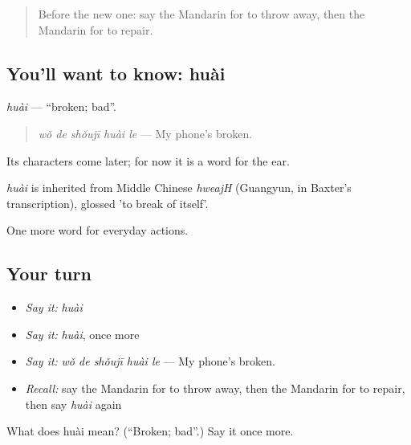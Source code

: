 \label{lesson:ZH-C103-huai}



\begin{quote}
Before the new one: say the Mandarin for to throw away, then the Mandarin for to repair.
\end{quote}

\subsection*{You'll want to know: huài}
\emph{huài} — \textquotedblleft{}broken; bad\textquotedblright{}.

\begin{quote}
\emph{wǒ de shǒujī huài le} — My phone's broken.
\end{quote}

Its characters come later; for now it is a word for the ear.

\begin{cousinweb}
\emph{huài} is inherited from Middle Chinese \emph{hweajH} (Guangyun, in Baxter's transcription), glossed 'to break of itself'.
\end{cousinweb}

\begin{grammarlens}[title={What you've built}]
One more word for everyday actions.
\end{grammarlens}

\subsection*{Your turn}
\begin{itemize}
\raggedright
  \item \emph{Say it:} \emph{huài}
  \item \emph{Say it:} \emph{huài}, once more
  \item \emph{Say it:} \emph{wǒ de shǒujī huài le} — My phone's broken.
  \item \emph{Recall:} say the Mandarin for to throw away, then the Mandarin for to repair, then say \emph{huài} again
\end{itemize}

\begin{tcolorbox}[breakable,colback=teal!4,colframe=teal!35!black,title={Before you move on}]
What does huài mean? (\textquotedblleft{}Broken; bad\textquotedblright{}.) Say it once more.
\end{tcolorbox}
